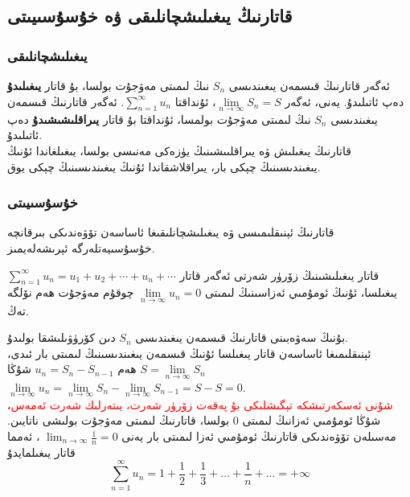 \subsection{قاتارنىڭ يىغىلىشچانلىقى ۋە خۇسۇسىيىتى}

\subsubsection{يىغىلىشچانلىقى}
ئەگەر قاتارنىڭ قىسمەن يىغىندىسى $S_n$ نىڭ لىمىتى مەۋجۇت بولسا، بۇ قاتار \textbf{يىغىلىدۇ} دەپ ئاتىلىدۇ. يەنى، ئەگەر $\lim\limits_{n\to\infty}S_n=S$، ئۇنداقتا $\sum\limits_{n=1}^\infty u_n$. 
ئەگەر قاتارنىڭ قىسمەن يىغىندىسى $S_n$ نىڭ لىمىتى مەۋجۇت بولمسا، ئۇنداقتا بۇ قاتار \textbf{يىراقلىشىشىدۇ} دەپ ئاتىلىدۇ.\\
قاتارنىڭ يىغىلىش ۋە يىراقلىىشىنىڭ يۈزەكى مەنىسى بولسا، يىغىلغاندا ئۇنىڭ يىغىندىسىنىڭ چېكى بار، يىراقلاشقاندا ئۇنىڭ يىغىندىسىنىڭ چېكى يوق.
\subsubsection{خۇسۇسىيىتى}
قاتارنىڭ ئېنىقلىمىسى ۋە يىغىلىشچانلىقىغا ئاساسەن تۆۋەندىكى بىرقانچە خۇسۇسىيەتلەرگە ئېرىشەلەيمىز.
\begin{WhiteRule}{قاتار يىغىلىشىنىڭ زۆرۈر شەرتى}{}%
ئەگەر قاتار 
$\sum\limits_{n=1}^\infty u_n=u_1+u_2+\cdots+u_n+\cdots$
 يىغىلسا، ئۇنىڭ ئومۇمىي ئەزاسىنىڭ لىمىتى 
$\lim\limits_{n \to \infty}u_n = 0$
 چوقۇم مەۋجۇت ھەم نۆلگە تەڭ.
\end{WhiteRule}
بۇنىڭ سەۋەبىنى قاتارنىڭ قىسمەن يىغىندىسى $S_n$ دىن كۆرۈۋىلىشقا بولىدۇ.\\
ئېنىقلىمىغا ئاساسەن قاتار يىغىلسا ئۇنىڭ قىسمەن يىغىندىسىنىڭ لىمىتى بار ئىدى،
$S = \lim\limits_{n \to \infty}S_n$
 ھەم
$u_n = S_n - S_{n-1}$
شۇڭا 
$\lim\limits_{n \to \infty}u_n = \lim\limits_{n \to \infty}S_n - \lim\limits_{n \to \infty}S_{n-1} = S-S=0$.\\
\textcolor{red}{شۇنى ئەسكەرتىشكە تېگىشلىكى بۇ پەقەت زۆرۈر شەرت، يىتەرلىك شەرت ئەمەس}، شۇڭا ئومۇمىي ئەزانىڭ لىمىتى $0$ بولسا، قاتارنىڭ لىمىتى مەۋجۇت بولىشى ناتايىن. مەسىلەن تۆۋەندىكى قاتارنىڭ ئومۇمىي ئەزا لىمىتى بار يەنى 
$
\lim_{n \to \infty} \frac{1}{n} = 0
$
، ئەمما قاتار يىغىلمايدۇ
$$
\sum\limits_{n=1}^\infty u_n = 1+\frac{1}{2}+\frac{1}{3}+...+\frac{1}{n}+... = +\infty
$$

